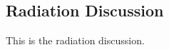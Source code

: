 \subsection{Radiation Discussion}
\label{sec:Radiation Results Discussion}

This is the radiation discussion.
